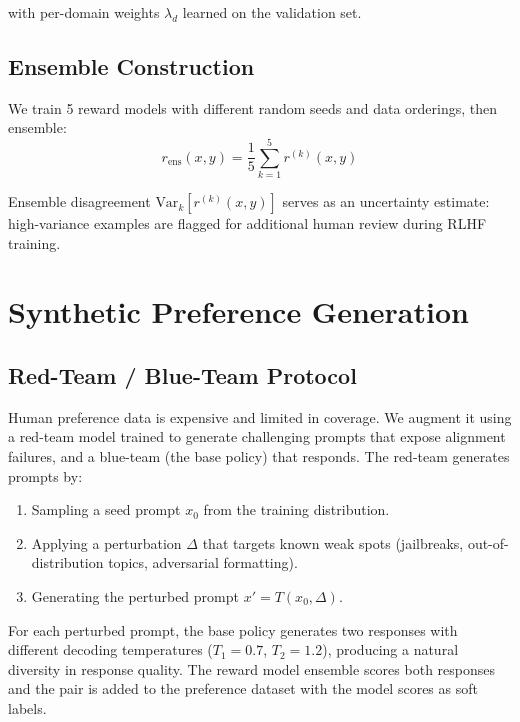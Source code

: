 \documentclass[11pt,a4paper]{article}
\begin{document}
with per-domain weights $\lambda_d$ learned on the validation set.

\subsection{Ensemble Construction}

We train 5 reward models with different random seeds and data orderings, then ensemble:
\begin{equation}
    r_{\text{ens}}(x, y) = \frac{1}{5}\sum_{k=1}^{5} r^{(k)}(x, y)
    \label{eq:ensemble}
\end{equation}

Ensemble disagreement $\text{Var}_{k}[r^{(k)}(x, y)]$ serves as an uncertainty estimate:
high-variance examples are flagged for additional human review during RLHF training.

\section{Synthetic Preference Generation}
\label{sec:synthetic}

\subsection{Red-Team / Blue-Team Protocol}

Human preference data is expensive and limited in coverage. We augment it using a
red-team model trained to generate challenging prompts that expose alignment failures,
and a blue-team (the base policy) that responds. The red-team generates prompts by:

\begin{enumerate}
    \item Sampling a seed prompt $x_0$ from the training distribution.
    \item Applying a perturbation $\Delta$ that targets known weak spots (jailbreaks,
          out-of-distribution topics, adversarial formatting).
    \item Generating the perturbed prompt $x' = T(x_0, \Delta)$.
\end{enumerate}

For each perturbed prompt, the base policy generates two responses with different
decoding temperatures ($T_1 = 0.7$, $T_2 = 1.2$), producing a natural diversity
in response quality. The reward model ensemble scores both responses and the pair is
added to the preference dataset with the model scores as soft labels.
\end{document}

